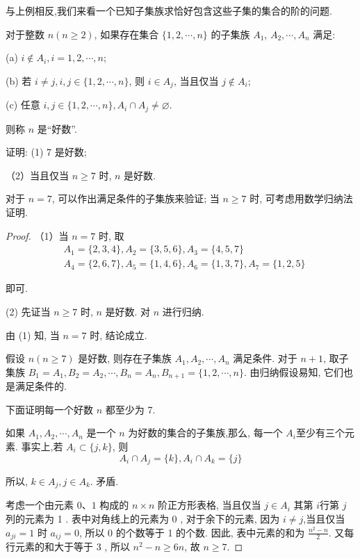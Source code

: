 与上例相反,我们来看一个已知子集族求恰好包含这些子集的集合的阶的问题.

\begin{example}
	对于整数 $n(n \geqslant 2)$, 如果存在集合 $\{1,2, \cdots, n\}$ 的子集族 $A_{1}$, $A_{2}, \cdots, A_{n}$ 满足:

	(a) $i \notin A_{i}, i=1,2, \cdots, n$;

	(b) 若 $i \neq j, i, j \in\{1,2, \cdots, n\}$, 则 $i \in A_{j}$, 当且仅当 $j \notin A_{i}$;

	(c) 任意 $i, j \in\{1,2, \cdots, n\}, A_{i} \cap A_{j} \neq \varnothing$.

	则称 $n$ 是“好数”.

	证明: (1) 7 是好数;

	（2）当且仅当 $n \geqslant 7$ 时, $n$ 是好数.
\end{example}

\begin{analysis}
	对于 $n=7$, 可以作出满足条件的子集族来验证; 当 $n \geqslant 7$ 时, 可考虑用数学归纳法证明.
\end{analysis}

\begin{proof}
	（1）当 $n=7$ 时, 取
	$$
		\begin{aligned}
			 & A_{1}=\{2,3,4\}, A_{2}=\{3,5,6\}, A_{3}=\{4,5,7\}                  \\
			 & A_{4}=\{2,6,7\}, A_{5}=\{1,4,6\}, A_{6}=\{1,3,7\}, A_{7}=\{1,2,5\}
		\end{aligned}
	$$

	即可.

	(2) 先证当 $n \geqslant 7$ 时, $n$ 是好数. 对 $n$ 进行归纳.

	由 (1) 知, 当 $n=7$ 时, 结论成立.

	假设 $n(n \geqslant 7)$ 是好数, 则存在子集族 $A_{1}, A_{2}, \cdots, A_{n}$ 满足条件. 对于 $n+1$, 取子集族 $B_{1}=A_{1}, B_{2}=A_{2}, \cdots, B_{n}=A_{n}, B_{n+1}=\{1,2, \cdots, n\}$. 由归纳假设易知, 它们也是满足条件的.

	下面证明每一个好数 $n$ 都至少为 7.

	如果 $A_{1}, A_{2}, \cdots, A_{n}$ 是一个 $n$ 为好数的集合的子集族,那么, 每一个 $A_{i}$至少有三个元素. 事实上,若 $A_{i} \subset\{j, k\}$, 则
	$$
		A_{i} \cap A_{j}=\{k\}, A_{i} \cap A_{k}=\{j\}
	$$

	所以, $k \in A_{j}, j \in A_{k}$. 矛盾.

	考虑一个由元素 $0 、 1$ 构成的 $n \times n$ 阶正方形表格, 当且仅当 $j \in A_{i}$ 其第 $i$行第 $j$ 列的元素为 1 . 表中对角线上的元素为 0 , 对于余下的元素, 因为 $i \neq j$,当且仅当 $a_{j i}=1$ 时 $a_{i j}=0$, 所以 0 的个数等于 1 的个数. 因此, 表中元素的和为 $\frac{n^{2}-n}{2}$. 又每行元素的和大于等于 3 , 所以 $n^{2}-n \geqslant 6 n$, 故 $n \geqslant 7$.
\end{proof}

